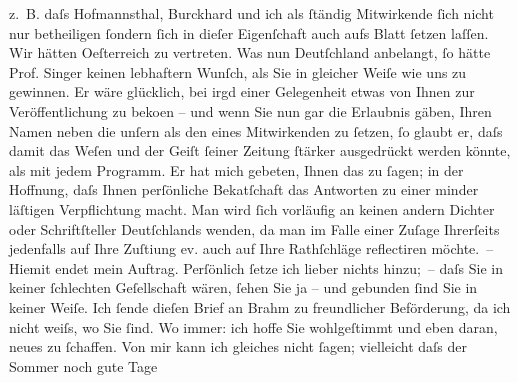 \begin{ledgroupsized}[t]{13cm}
                    z. B. daſs Hof{\pb}mannsthal, Burckhard und ich als
                    ſtändig Mitwirkende ſich nicht nur betheiligen ſondern ſich in dieſer
                    Eigenſchaft auch aufs Blatt ſetzen laſſen. Wir hätten Oeſterreich zu vertreten. Was nun Deutſchland anbelangt, ſo hätte Prof. Singer keinen lebhaftern Wunſch, als Sie {\pb}in gleicher Weiſe wie uns zu gewinnen. Er wäre glücklich,
                    bei irgd einer Gelegenheit etwas von Ihnen zur Veröffentlichung zu beko{\geminationm}en – und wenn Sie nun gar die Erlaubnis gäben,
                    Ihren Namen neben die unſern als den eines Mitwirkenden zu ſetzen, ſo glaubt er,
                    daſs damit das Weſen und der Geiſt ſeiner Zeitung ſtärker {\pb}ausgedrückt werden könnte, als mit jedem Programm. Er hat mich gebeten, Ihnen
                    das zu ſagen; in der Hoffnung, daſs Ihnen perſönliche Beka{\geminationn}tſchaft das Antworten zu einer minder läſtigen
                    Verpflichtung macht. Man wird ſich vorläufig an keinen andern Dichter oder
                    Schriftſteller Deutſch{\pb}lands wenden, da man im Falle einer Zuſage Ihrerſeits jedenfalls auf Ihre
                        Zuſti{\geminationm}ung ev. auch auf Ihre Rathſchläge
                    reflectiren möchte. –\pend
           \pstart
           Hiemit endet mein Auftrag. Perſönlich ſetze ich lieber nichts hinzu; – daſs Sie
                    in keiner ſchlechten Geſellschaft wären, ſehen Sie ja – und gebunden ſind {\pb}Sie in keiner Weiſe.\pend
           \pstart
           Ich ſende dieſen Brief an Brahm zu
                    freundlicher Beförderung, da ich nicht weiſs, wo Sie ſind. Wo immer: ich hoffe
                    Sie wohlgeſtimmt und eben daran, neues zu ſchaffen.\pend
           \pstart
           Von mir kann ich gleiches nicht ſagen; vielleicht daſs der Sommer noch gute Tage

\end{ledgroupsized}
